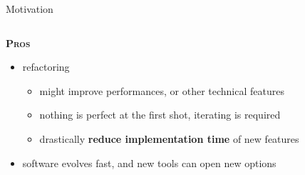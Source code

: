 \documentclass[9pt]{beamer}
\begin{document}
\begin{frame}{Motivation}
\begin{columns}
\begin{column}{0.5\textwidth}
            \textsc{\color{mLightGreen} \textbf{Pros}}
            \begin{itemize}
                \item refactoring
                \begin{itemize}
                    \item might improve performances, or other technical features
                    \item nothing is perfect at the first shot, iterating is required
                    \item drastically \textbf{reduce implementation time} of
                      new features
                \end{itemize}
                \item software evolves fast, and new tools can open new options
            \end{itemize}
        \end{column}
    \end{columns}
\end{frame}
\end{document}
